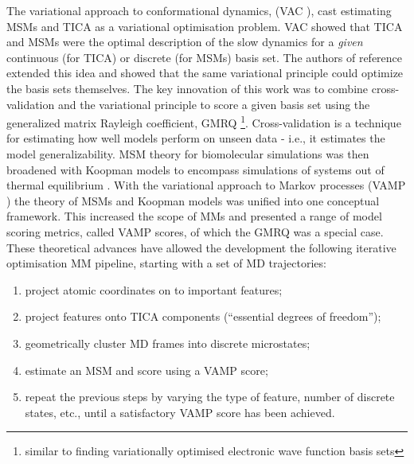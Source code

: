 The variational approach to conformational dynamics, (VAC \cite{nuskeVariationalApproachMolecular2014}), cast estimating MSMs and TICA as a variational optimisation problem. VAC showed that TICA and MSMs were the optimal description of the slow dynamics for a \emph{given} continuous (for TICA) or discrete (for MSMs) basis set.  The authors of reference \cite{mcgibbonVariationalCrossvalidationSlow2015} extended this idea and showed that the same variational principle could optimize the basis sets themselves. The key innovation of this work was to combine cross-validation \cite{arlotSurveyCrossvalidationProcedures2009} and the variational principle to score a given basis set using the generalized matrix Rayleigh coefficient, GMRQ \footnote{similar to finding variationally optimised electronic wave function basis sets}. Cross-validation is a  technique for estimating how well models perform on unseen data - i.e., it estimates the model generalizability. MSM theory for biomolecular simulations was then broadened with Koopman models to encompass simulations of systems out of thermal equilibrium \cite{wuVariationalKoopmanModels2017}. With the variational approach to Markov processes (VAMP \cite{wuVariationalApproachLearning2020c}) the theory of MSMs and Koopman models was unified into one conceptual framework. This increased the scope of MMs and presented a range of model scoring metrics, called VAMP scores, of which the GMRQ was a special case. These theoretical advances have allowed the development the following iterative optimisation MM pipeline, starting with a set of MD trajectories:

\begin{enumerate}
    \item project atomic coordinates on to important features;
    \item project features onto TICA components (``essential degrees of freedom'');
    \item geometrically cluster MD frames into discrete microstates;
    \item estimate an MSM and score using a VAMP score;
    \item repeat the previous steps by varying the type of feature, number of discrete states, etc., until a satisfactory VAMP score has been achieved.   
\end{enumerate}

